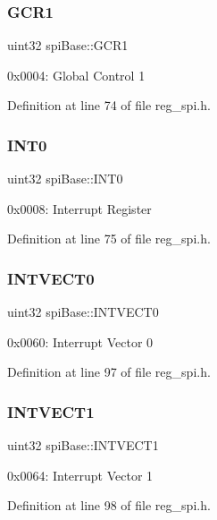 \subsubsection{\texorpdfstring{G\+C\+R1}{GCR1}}
{\footnotesize\ttfamily uint32 spi\+Base\+::\+G\+C\+R1}

0x0004\+: Global Control 1 

Definition at line 74 of file reg\+\_\+spi.\+h.

\mbox{\label{structspiBase_a4d76cd9f7fa6c1d884367100952142f8}} 
\subsubsection{\texorpdfstring{I\+N\+T0}{INT0}}
{\footnotesize\ttfamily uint32 spi\+Base\+::\+I\+N\+T0}

0x0008\+: Interrupt Register 

Definition at line 75 of file reg\+\_\+spi.\+h.

\mbox{\label{structspiBase_a54f67b59e720aa925e5b601b44a04d09}} 
\subsubsection{\texorpdfstring{I\+N\+T\+V\+E\+C\+T0}{INTVECT0}}
{\footnotesize\ttfamily uint32 spi\+Base\+::\+I\+N\+T\+V\+E\+C\+T0}

0x0060\+: Interrupt Vector 0 

Definition at line 97 of file reg\+\_\+spi.\+h.

\mbox{\label{structspiBase_a4357e891f573db9392cc760469346051}} 
\subsubsection{\texorpdfstring{I\+N\+T\+V\+E\+C\+T1}{INTVECT1}}
{\footnotesize\ttfamily uint32 spi\+Base\+::\+I\+N\+T\+V\+E\+C\+T1}

0x0064\+: Interrupt Vector 1 

Definition at line 98 of file reg\+\_\+spi.\+h.

